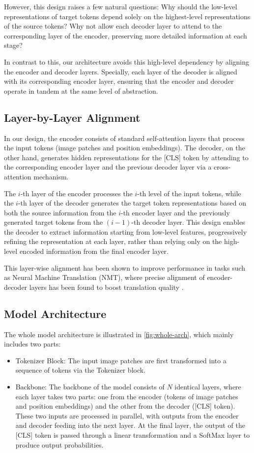 However, this design raises a few natural questions: Why should the low-level representations of target tokens depend solely on the highest-level representations of the source tokens? Why not allow each decoder layer to attend to the corresponding layer of the encoder, preserving more detailed information at each stage?

In contrast to this, our architecture avoids this high-level dependency by aligning the encoder and decoder layers.
Specially, each layer of the decoder is aligned with its corresponding encoder layer, ensuring that the encoder and decoder operate in tandem at the same level of abstraction.

\subsection{Layer-by-Layer Alignment}

In our design, the encoder consists of standard self-attention layers that process the input tokens (image patches and position embeddings). The decoder, on the other hand, generates hidden representations for the [CLS] token by attending to the corresponding encoder layer and the previous decoder layer via a cross-attention mechanism.

The $i$-th layer of the encoder processes the $i$-th level of the input tokens, while the $i$-th layer of the decoder generates the target token representations based on both the source information from the $i$-th encoder layer and the previously generated target tokens from the $(i-1)$-th decoder layer. This design enables the decoder to extract information starting from low-level features, progressively refining the representation at each layer, rather than relying only on the high-level encoded information from the final encoder layer.

This layer-wise alignment has been shown to improve performance in tasks such as Neural Machine Translation (NMT), where precise alignment of encoder-decoder layers has been found to boost translation quality \cite{he2018layer}.

\subsection{Model Architecture} \label{subsection:model-arch}

The whole model architecture is illustrated in \cref{fig:whole-arch}, which mainly includes two parts:
\begin{itemize}
  \item Tokenizer Block: The input image patches are first transformed into a sequence of tokens via the Tokenizer block.
  \item Backbone: The backbone of the model consists of $N$ identical layers, where each layer takes two parts: one from the encoder (tokens of image patches and position embeddings) and the other from the decoder ([CLS] token). These two inputs are processed in parallel, with outputs from the encoder and decoder feeding into the next layer. At the final layer, the output of the [CLS] token is passed through a linear transformation and a SoftMax layer to produce output probabilities.
\end{itemize}

